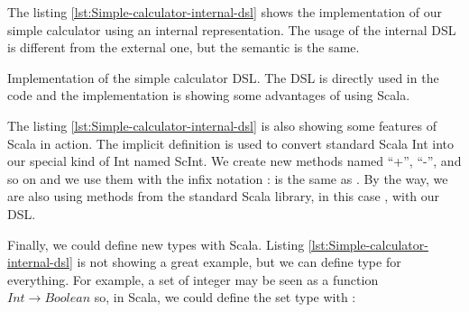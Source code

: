 The listing \ref{lst:Simple-calculator-internal-dsl} shows the implementation of
our simple calculator using an internal representation. The usage of the
internal \gls{DSL} is different from the external one, but the semantic is the
same.

\begin{listing}[ht]
\centering
{}
\caption[Implementation of the simple calculator \gls{DSL}]{Implementation of
the simple calculator \gls{DSL}. The DSL is directly used in the code and
the implementation is showing some advantages of using Scala.}
\label{lst:Simple-calculator-internal-dsl}
\end{listing}

The listing \ref{lst:Simple-calculator-internal-dsl} is also showing some
features of Scala in action. The implicit definition  is used to
convert standard Scala Int into our special kind of Int named ScInt. We create
new methods named ``+'', ``-'', and so on and we use them with the infix
notation :  is the same as . By the way,
we are also using methods from the standard Scala library, in this case
, with our \gls{DSL}.

Finally, we could define new types with Scala. Listing
\ref{lst:Simple-calculator-internal-dsl} is not showing a great example,
but we can define type for everything. For example, a set of integer may be seen
as a function $Int \rightarrow Boolean$ so, in Scala, we could define the set
type with :

